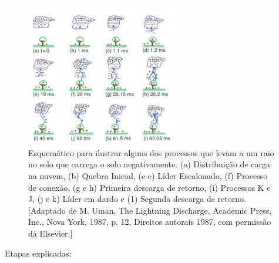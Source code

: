 \documentclass[a4paper, 12pt, onecolumn,singlespacing]{article}
\begin{document}
		\begin{figure}[h]
			\centering
			\includegraphics[width=0.6\textwidth]{imagens/lightning_process.png}
			\caption{Esquemático para ilustrar alguns dos processos que levam a um raio no solo que carrega o solo negativamente. (a) Distribuição de carga na nuvem, (b) Quebra Inicial, (c-e) Líder Escalonado, (f) Processo de conexão, (g e h) Primeira descarga de retorno, (i) Processos K e J, (j e k) Líder em dardo e (1) Segunda descarga de retorno. [Adaptado de M. Uman, The Lightning Discharge, Academic Press, Inc., Nova York, 1987, p. 12, Direitos autorais 1987, com permissão da Elsevier.]}
			\label{lightning_process}
		\end{figure}
		
		Etapas explicadas: 
		
\end{document}

